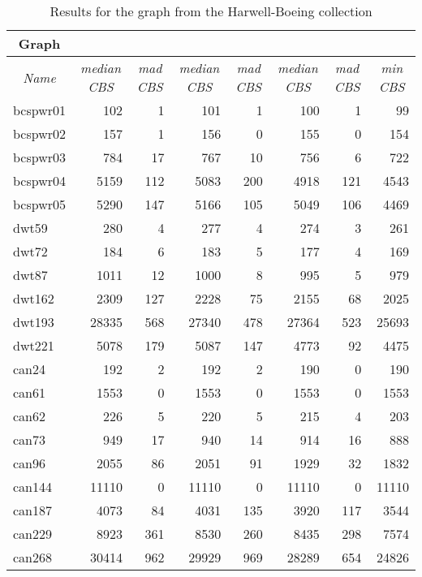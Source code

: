 \documentclass{scrartcl}
\theoremstyle{plain}
\newcommand{\cbs}{CBS}
\begin{document}
\begin{table}[!ht]
	\centering
	\scriptsize
	\begin{tabular}{|l|rr|rr|rr|r|}
	\hline
\multicolumn{1}{|c|}{\textbf{Graph}} & 

\multicolumn{2}{c|}{} & 
\multicolumn{2}{c|}{} &  
\multicolumn{2}{c|}{} & \\ 
\hline	

\multicolumn{1}{|c|}{\emph{Name}} &

\multicolumn{1}{c}{\emph{median \cbs{}}} & 
\multicolumn{1}{c|}{\emph{mad \cbs{}}} &

\multicolumn{1}{c}{\emph{median \cbs{}}} & 
\multicolumn{1}{c|}{\emph{mad \cbs{}}} &

\multicolumn{1}{c}{\emph{median \cbs{}}} & 
\multicolumn{1}{c|}{\emph{mad \cbs{}}} &

\multicolumn{1}{c|}{\emph{min \cbs{}}}

\\ \hline

\makeatletter{}bcspwr01 & 102 & 1 & 101 & 1 & 100 & 1 & 99 \\ 
bcspwr02 & 157 & 1 & 156 & 0 & 155 & 0 & 154 \\ 
bcspwr03 & 784 & 17 & 767 & 10 & 756 & 6 & 722 \\ 
bcspwr04 & 5159 & 112 & 5083 & 200 & 4918 & 121 & 4543 \\ 
bcspwr05 & 5290 & 147 & 5166 & 105 & 5049 & 106 & 4469 \\ 
dwt59 & 280 & 4 & 277 & 4 & 274 & 3 & 261 \\ 
dwt72 & 184 & 6 & 183 & 5 & 177 & 4 & 169 \\ 
dwt87 & 1011 & 12 & 1000 & 8 & 995 & 5 & 979 \\ 
dwt162 & 2309 & 127 & 2228 & 75 & 2155 & 68 & 2025 \\ 
dwt193 & 28335 & 568 & 27340 & 478 & 27364 & 523 & 25693 \\ 
dwt221 & 5078 & 179 & 5087 & 147 & 4773 & 92 & 4475 \\ 
can24 & 192 & 2 & 192 & 2 & 190 & 0 & 190 \\ 
can61 & 1553 & 0 & 1553 & 0 & 1553 & 0 & 1553 \\ 
can62 & 226 & 5 & 220 & 5 & 215 & 4 & 203 \\ 
can73 & 949 & 17 & 940 & 14 & 914 & 16 & 888 \\ 
can96 & 2055 & 86 & 2051 & 91 & 1929 & 32 & 1832 \\ 
can144 & 11110 & 0 & 11110 & 0 & 11110 & 0 & 11110 \\ 
can187 & 4073 & 84 & 4031 & 135 & 3920 & 117 & 3544 \\ 
can229 & 8923 & 361 & 8530 & 260 & 8435 & 298 & 7574 \\ 
can268 & 30414 & 962 & 29929 & 969 & 28289 & 654 & 24826 \\ 
 

\hline
\end{tabular}


	\caption{\label{tab:harwell_sto}Results for the graph from the 
Harwell-Boeing collection}
\end{table}
\end{document}
